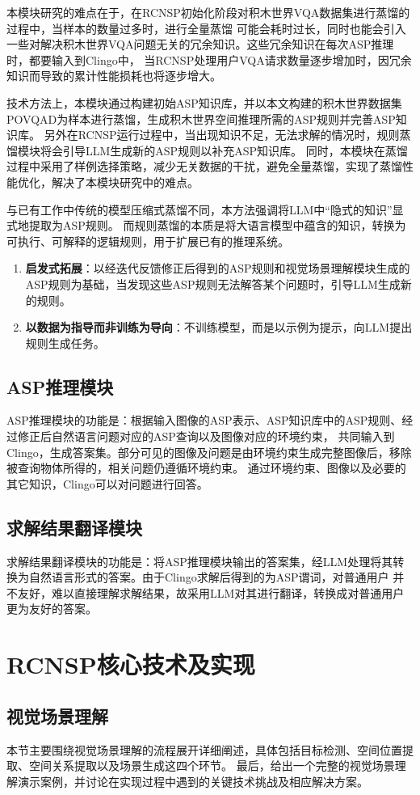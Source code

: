 本模块研究的难点在于，在RCNSP初始化阶段对积木世界VQA数据集进行蒸馏的过程中，当样本的数量过多时，进行全量蒸馏
可能会耗时过长，同时也能会引入一些对解决积木世界VQA问题无关的冗余知识。这些冗余知识在每次ASP推理时，都要输入到Clingo中，
当RCNSP处理用户VQA请求数量逐步增加时，因冗余知识而导致的累计性能损耗也将逐步增大。

技术方法上，本模块通过构建初始ASP知识库，并以本文构建的积木世界数据集POVQA\-D为样本进行蒸馏，生成积木世界空间推理所需的ASP规则并完善ASP知识库。
另外在RCNSP运行过程中，当出现知识不足，无法求解的情况时，规则蒸馏模块将会引导LLM生成新的ASP规则以补充ASP知识库。
同时，本模块在蒸馏过程中采用了样例选择策略，减少无关数据的干扰，避免全量蒸馏，实现了蒸馏性能优化，解决了本模块研究中的难点。

与已有工作中传统的模型压缩式蒸馏不同，本方法强调将LLM中“隐式的知识”显式地提取为ASP规则。
而规则蒸馏的本质是将大语言模型中蕴含的知识，转换为可执行、可解释的逻辑规则，用于扩展已有的推理系统。
\begin{enumerate}[nosep]
\item \textbf{启发式拓展}：以经迭代反馈修正后得到的ASP规则和视觉场景理解模块生成的ASP规则为基础，当发现这些ASP规则无法解答某个问题时，引导LLM生成新的规则。
\item \textbf{以数据为指导而非训练为导向}：不训练模型，而是以示例为提示，向LLM提出规则生成任务。
\end{enumerate}
\subsection{ASP推理模块}
ASP推理模块的功能是：根据输入图像的ASP表示、ASP知识库中的ASP规则、经过修正后自然语言问题对应的ASP查询以及图像对应的环境约束，
共同输入到Clingo，生成答案集。部分可见的图像及问题是由环境约束生成完整图像后，移除被查询物体所得的，相关问题仍遵循环境约束。
通过环境约束、图像以及必要的其它知识，Clingo可以对问题进行回答。
\subsection{求解结果翻译模块}
求解结果翻译模块的功能是：将ASP推理模块输出的答案集，经LLM处理将其转换为自然语言形式的答案。由于Clingo求解后得到的为ASP谓词，对普通用户
并不友好，难以直接理解求解结果，故采用LLM对其进行翻译，转换成对普通用户更为友好的答案。
\section{RCNSP核心技术及实现}
\subsection{视觉场景理解}
本节主要围绕视觉场景理解的流程展开详细阐述，具体包括目标检测、空间位置提取、空间关系提取以及场景生成这四个环节。
最后，给出一个完整的视觉场景理解演示案例，并讨论在实现过程中遇到的关键技术挑战及相应解决方案。

